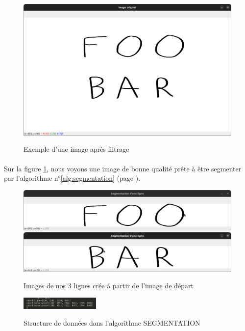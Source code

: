 \documentclass[a4paper]{article}
\begin{document}
			\begin{figure}
				\caption{Exemple d'une image après filtrage}
				\includegraphics[width=\textwidth]{segmentation_image_originel.png}
				\centering
				\label{fig:imageOriginel}
			\end{figure}
			\paragraph{} Sur la figure \ref{fig:imageOriginel}, nous voyons une image de bonne qualité prête à être segmenter par l'algorithme n°\ref{alg:segmentation} (page \pageref{alg:segmentation}). 
			\begin{figure}
				\caption{Images de nos 3 lignes crée à partir de l'image de départ}
				\includegraphics[width=.8\textwidth]{segmentation_ligne1.png}
				\centering
				\includegraphics[width=.8\textwidth]{segmentation_ligne2.png}
				\centering
				\label{fig:imageLignes}
			\end{figure}
			\begin{figure}
					\caption{Structure de données dans l'algorithme SEGMENTATION}
					\includegraphics[width=0.35\textwidth]{structDonnee.png}
					\label{fig:structDonnee}
			\end{figure}
\end{document}
